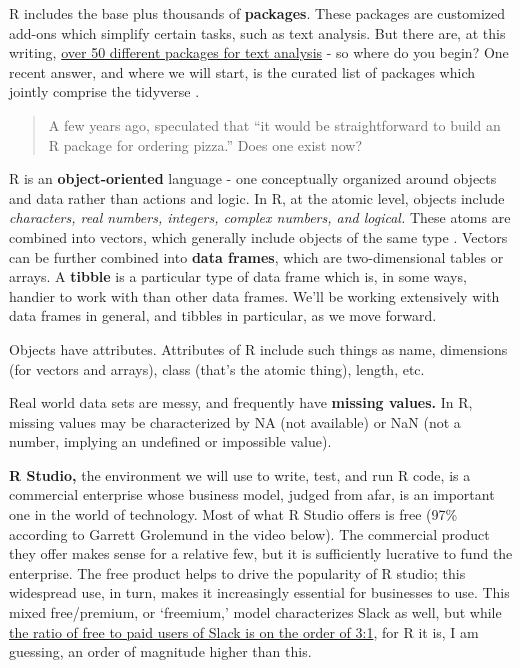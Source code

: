 \documentclass[openany]{book}
\begin{document}
R includes the base plus thousands of \textbf{packages}. These packages are customized add-ons which simplify certain tasks, such as text analysis. But there are, at this writing, \href{https://cran.r-project.org/web/views/NaturalLanguageProcessing.html}{over 50 different packages for text analysis} - so where do you begin? One recent answer, and where we will start, is the curated list of packages which jointly comprise the tidyverse \citep{wickham2016r}.

\begin{quote}
A few years ago, \citet{peng2015r} speculated that ``it would be straightforward to build an R package for ordering pizza.'' Does one exist now?
\end{quote}

R is an \textbf{object-oriented} language - one conceptually organized around objects and data rather than actions and logic. In R, at the atomic level, objects include \emph{characters, real numbers, integers, complex numbers, and logical.} These atoms are combined into vectors, which generally include objects of the same type \citep[one kind of object, `lists,' is an exception to this;][]{peng2015r}. Vectors can be further combined into \textbf{data frames}, which are two-dimensional tables or arrays. A \textbf{tibble} is a particular type of data frame which is, in some ways, handier to work with than other data frames. We'll be working extensively with data frames in general, and tibbles in particular, as we move forward.

Objects have attributes. Attributes of R include such things as name, dimensions (for vectors and arrays), class (that's the atomic thing), length, etc.

Real world data sets are messy, and frequently have \textbf{missing values.} In R, missing values may be characterized by NA (not available) or NaN (not a number, implying an undefined or impossible value).

\textbf{R Studio,} the environment we will use to write, test, and run R code, is a commercial enterprise whose business model, judged from afar, is an important one in the world of technology. Most of what R Studio offers is free (97\% according to Garrett Grolemund in the video below). The commercial product they offer makes sense for a relative few, but it is sufficiently lucrative to fund the enterprise. The free product helps to drive the popularity of R studio; this widespread use, in turn, makes it increasingly essential for businesses to use. This mixed free/premium, or `freemium,' model characterizes Slack as well, but while \href{https://www.statista.com/statistics/652779/worldwide-slack-users-total-vs-paid/}{the ratio of free to paid users of Slack is on the order of 3:1}, for R it is, I am guessing, an order of magnitude higher than this.
\end{document}
